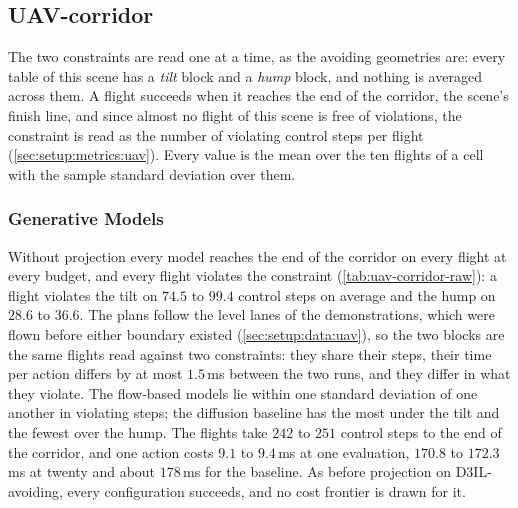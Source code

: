 \subsection{UAV-corridor}\label{sec:res:uav:corridor}

The two constraints are read one at a time, as the avoiding geometries are: every table of this scene has a
\emph{tilt} block and a \emph{hump} block, and nothing is averaged across them. A flight succeeds when it
reaches the end of the corridor, the scene's finish line, and since almost no flight of this scene is free
of violations, the constraint is read as the number of violating control steps per flight
(\autoref{sec:setup:metrics:uav}). Every value is the mean over the ten flights of a cell with the sample
standard deviation over them.

\subsubsection{Generative Models}\label{sec:res:uav:corridor:raw}
Without projection every model reaches the end of the corridor on every flight at every budget, and every
flight violates the constraint (\autoref{tab:uav-corridor-raw}): a flight violates the tilt on $74.5$ to
$99.4$ control steps on average and the hump on $28.6$ to $36.6$. The plans follow the level lanes of the
demonstrations, which were flown before either boundary existed (\autoref{sec:setup:data:uav}), so the two
blocks are the same flights read against two constraints: they share their steps, their time per action
differs by at most $1.5$\,ms between the two runs, and they differ in what they violate. The flow-based
models lie within one standard deviation of one another in violating steps; the diffusion baseline has the
most under the tilt and the fewest over the hump. The flights take $242$ to $251$ control steps to the end
of the corridor, and one action costs $9.1$ to $9.4$\,ms at one evaluation, $170.8$ to $172.3$\,ms at
twenty and about $178$\,ms for the baseline. As before projection on D3IL-avoiding, every configuration
succeeds, and no cost frontier is drawn for it.

